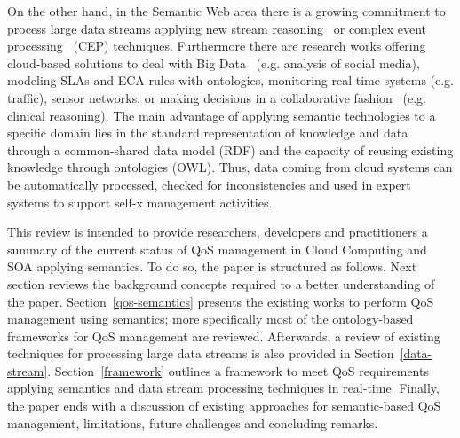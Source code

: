 On the other hand, in the Semantic Web area there is a growing commitment to process large data streams applying 
new stream reasoning~\cite{Bolles:2008:SSE:1789394.1789438,Barbieri:2010:EEC:1739041.1739095} 
or complex event processing~\cite{Anicic:2011:EUL:1963405.1963495} (CEP) techniques. Furthermore there are research works offering cloud-based 
solutions to deal with Big Data~\cite{Fan:2013:MBD:2481244.2481246} (e.g. analysis of social media), modeling SLAs and ECA rules with ontologies, 
monitoring real-time systems (e.g. traffic), sensor networks, or making decisions in a collaborative fashion~\cite{RodriGuez-GonzaLez:2012:UAP:2350799.2350907} (e.g. clinical reasoning). 
The main advantage of applying semantic technologies to a specific domain lies in the standard representation of knowledge and data through a common-shared data model (RDF) and the 
capacity of reusing existing knowledge through ontologies (OWL). Thus, data coming from cloud systems can be automatically processed, checked for inconsistencies and 
used in expert systems to support self-x management activities.

This review is intended to provide researchers, developers and practitioners a summary of the current status of QoS management in Cloud Computing and SOA applying semantics. To do so, the paper 
is structured as follows. Next section reviews the background concepts required to a better understanding of the paper. Section~\ref{qos-semantics} 
presents the existing works to perform QoS management using semantics; more specifically most of the ontology-based frameworks for 
QoS management are reviewed. Afterwards, a review of existing techniques for processing large data streams is also provided in Section~\ref{data-stream}. 
Section~\ref{framework} outlines a framework to meet QoS requirements applying semantics and data stream processing techniques in real-time. 
Finally, the paper ends with a discussion of existing approaches for semantic-based QoS management, 
limitations, future challenges and concluding remarks. 

